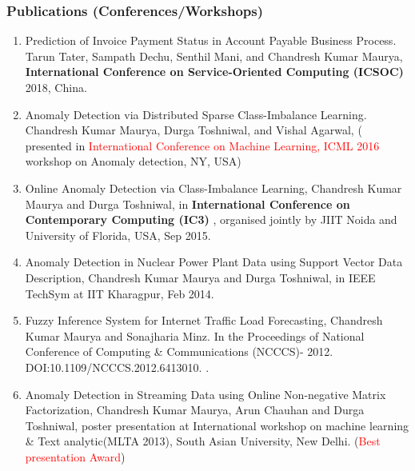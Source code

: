 \documentclass[blue]{beamer}
\begin{document}
\begin{frame}[shrink=20]
\footnotesize
\frametitle{Publications (Conferences/Workshops)}

\begin{enumerate} 
\item 
Prediction of Invoice Payment Status in Account Payable Business Process. Tarun Tater, Sampath Dechu, Senthil Mani, and Chandresh Kumar Maurya, {\bf International Conference on Service-Oriented Computing (ICSOC)} 2018, China.

\item
 Anomaly Detection via Distributed Sparse Class-Imbalance Learning. Chandresh Kumar Maurya, Durga Toshniwal, and  Vishal Agarwal, ( presented in \textcolor{red}{International Conference on Machine Learning, ICML 2016} workshop on Anomaly detection, NY, USA)


\item
Online Anomaly Detection via Class-Imbalance Learning, Chandresh Kumar Maurya and Durga Toshniwal,  in  {\bf International Conference on Contemporary Computing (IC3)} , organised jointly by JIIT Noida and University of Florida, USA, Sep 2015.

\item
 Anomaly Detection in Nuclear Power Plant Data using Support Vector Data Description, Chandresh Kumar Maurya and Durga Toshniwal, in  IEEE TechSym at IIT Kharagpur, Feb 2014.

\item  Fuzzy Inference System for Internet Traffic Load Forecasting, Chandresh Kumar Maurya and Sonajharia Minz. In the Proceedings of National Conference of Computing \& Communications (NCCCS)-
2012. DOI:10.1109/NCCCS.2012.6413010. .

\item
Anomaly Detection in Streaming Data using Online Non-negative Matrix Factorization, Chandresh Kumar Maurya, Arun Chauhan and Durga Toshniwal, poster presentation at International workshop on machine learning \& Text analytic(MLTA 2013), South Asian University, New Delhi.  (\textcolor{red}{Best  presentation Award})
\end{enumerate}
\end{frame}
\end{document}
